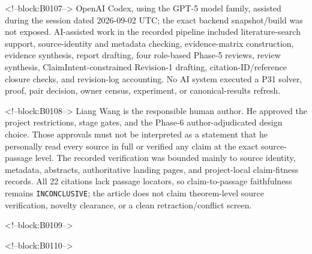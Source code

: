 \documentclass[11pt]{article}
\begin{document}
<!--block:B0107-->
OpenAI Codex, using the GPT-5 model family, assisted during the session
dated 2026-09-02 UTC; the exact backend snapshot/build was not exposed.
AI-assisted work in the recorded pipeline included literature-search
support, source-identity and metadata checking, evidence-matrix
construction, evidence synthesis, report drafting, four role-based
Phase-5 reviews, review synthesis, ClaimIntent-constrained Revision-1
drafting, citation-ID/reference closure checks, and revision-log
accounting. No AI system executed a P31 solver, proof, pair decision,
owner census, experiment, or canonical-results refresh.

<!--block:B0108-->
Liang Wang is the responsible human author. He approved the project
restrictions, stage gates, and the Phase-6 author-adjudicated design
choice. Those approvals must not be interpreted as a statement that he
personally read every source in full or verified any claim at the exact
source-passage level. The recorded verification was bounded mainly to
source identity, metadata, abstracts, authoritative landing pages, and
project-local claim-fitness records. All 22 citations lack passage
locators, so claim-to-passage faithfulness remains
\texttt{INCONCLUSIVE}; the article does not claim theorem-level source
verification, novelty clearance, or a clean retraction/conflict screen.

<!--block:B0109-->



<!--block:B0110-->
\end{document}
